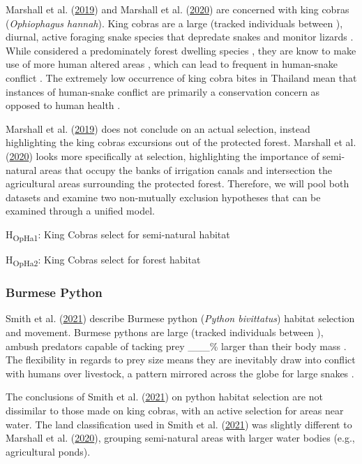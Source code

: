 \documentclass[10pt,a4paper]{article}
\begin{document}
Marshall et al. (\protect\hyperlink{ref-Marshall2018}{2019}) and Marshall et al. (\protect\hyperlink{ref-marshall_no_2020}{2020}) are concerned with king cobras (\emph{Ophiophagus hannah}).
King cobras are a large (tracked individuals between ), diurnal, active foraging snake species that depredate snakes and monitor lizards .
While considered a predominately forest dwelling species , they are know to make use of more human altered areas , which can lead to frequent in human-snake conflict .
The extremely low occurrence of king cobra bites in Thailand mean that instances of human-snake conflict are primarily a conservation concern as opposed to human health .

Marshall et al. (\protect\hyperlink{ref-Marshall2018}{2019}) does not conclude on an actual selection, instead highlighting the king cobras excursions out of the protected forest.
Marshall et al. (\protect\hyperlink{ref-marshall_no_2020}{2020}) looks more specifically at selection, highlighting the importance of semi-natural areas that occupy the banks of irrigation canals and intersection the agricultural areas surrounding the protected forest.
Therefore, we will pool both datasets and examine two non-mutually exclusion hypotheses that can be examined through a unified model.

H\textsubscript{OpHa1}: King Cobras select for semi-natural habitat

H\textsubscript{OpHa2}: King Cobras select for forest habitat

\hypertarget{burmese-python}{%
\subsubsection{Burmese Python}\label{burmese-python}}

Smith et al. (\protect\hyperlink{ref-smith_native_2021}{2021}) describe Burmese python (\emph{Python bivittatus}) habitat selection and movement.
Burmese pythons are large (tracked individuals between ), ambush predators capable of tacking prey \_\_\_\% larger than their body mass .
The flexibility in regards to prey size means they are inevitably draw into conflict with humans over livestock, a pattern mirrored across the globe for large snakes .

The conclusions of Smith et al. (\protect\hyperlink{ref-smith_native_2021}{2021}) on python habitat selection are not dissimilar to those made on king cobras, with an active selection for areas near water.
The land classification used in Smith et al. (\protect\hyperlink{ref-smith_native_2021}{2021}) was slightly different to Marshall et al. (\protect\hyperlink{ref-marshall_no_2020}{2020}), grouping semi-natural areas with larger water bodies (e.g., agricultural ponds).
\end{document}
